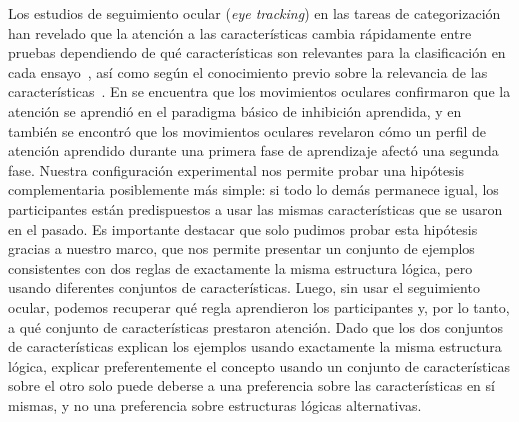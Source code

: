 Los estudios de seguimiento ocular ({\em eye tracking}) en las tareas de categorización han revelado que la atención a las características cambia rápidamente entre pruebas dependiendo de qué características son relevantes para la clasificación en cada ensayo~\cite{blair2009extremely}, así como según el conocimiento previo sobre la relevancia de las características~\cite{kim2011prior}. En \cite {kruschke2005eye} se encuentra que los movimientos oculares confirmaron que la atención se aprendió en el paradigma básico de inhibición aprendida, y en~\cite{hoffman2010costs} también se encontró que los movimientos oculares revelaron cómo un perfil de atención aprendido durante una primera fase de aprendizaje afectó una segunda fase. Nuestra configuración experimental nos permite probar una hipótesis complementaria posiblemente más simple: si todo lo demás permanece igual, los participantes están predispuestos a usar las mismas características que se usaron en el pasado. Es importante destacar que solo pudimos probar esta hipótesis gracias a nuestro marco, que nos permite presentar un conjunto de ejemplos consistentes con dos reglas de exactamente la misma estructura lógica, pero usando diferentes conjuntos de características. Luego, sin usar el seguimiento ocular, podemos recuperar qué regla aprendieron los participantes y, por lo tanto, a qué conjunto de características prestaron atención. Dado que los dos conjuntos de características explican los ejemplos usando exactamente la misma estructura lógica, explicar preferentemente el concepto usando un conjunto de características sobre el otro solo puede deberse a una preferencia sobre las características en sí mismas, y no una preferencia sobre estructuras lógicas alternativas.



